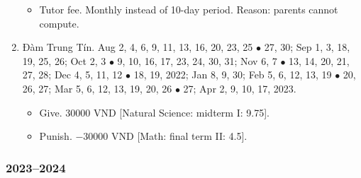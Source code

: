 \documentclass{article}
\begin{document}
\begin{enumerate}
	\begin{itemize}
		\item {\sf Tutor fee.} Monthly instead of 10-day period. Reason: parents cannot compute.
	\end{itemize}
	\item {\sc Đàm Trung Tín.} {\sf[In]} Aug 2, 4, 6, 9, 11, 13, 16, 20, 23, 25 $\bullet$ 27, 30; Sep 1, 3, 18, 19, 25, 26; Oct 2, 3 $\bullet$ 9, 10, 16, 17, 23, 24, 30, 31; Nov 6, 7 $\bullet$ 13, 14, 20, 21, 27, 28; Dec 4, 5, 11, 12 $\bullet$ 18, 19, 2022; Jan 8, 9, 30; Feb 5, 6, 12, 13, 19 $\bullet$ 20, 26, 27; Mar 5, 6, 12, 13, 19, 20, 26 $\bullet$ 27; Apr 2, 9, 10, 17, 2023. {\sf[Out]}
	\begin{itemize}
		\item {\sf Give.} 30000 VND [Natural Science: midterm I: 9.75].
		\item {\sf Punish.} $-30000$ VND [Math: final term II: 4.5].
	\end{itemize}
\end{enumerate}

\subsubsection{2023--2024}
 
\end{document}
